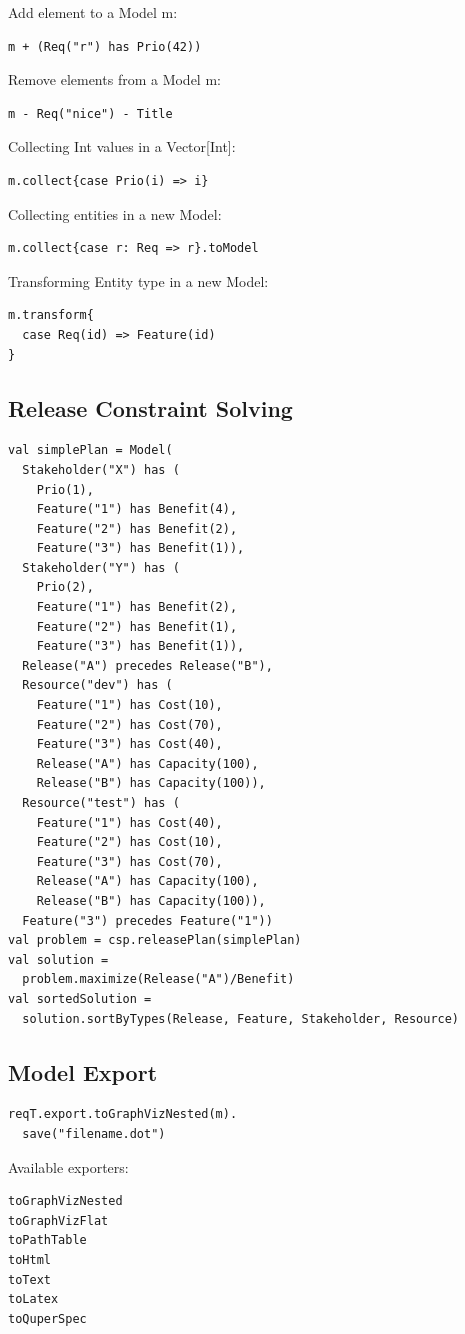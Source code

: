 \documentclass[9pt,a4paper,oneside]{report}
\begin{document}
\begin{multicols*}{4}
Add element to a Model m: 
\begin{lstlisting}
m + (Req("r") has Prio(42))
\end{lstlisting}

Remove elements from a Model m:
\begin{lstlisting}
m - Req("nice") - Title
\end{lstlisting}

Collecting Int values in a Vector[Int]:
\begin{lstlisting}
m.collect{case Prio(i) => i}
\end{lstlisting}

Collecting entities in a new Model:
\begin{lstlisting}
m.collect{case r: Req => r}.toModel
\end{lstlisting}

Transforming Entity type in a new Model:
\begin{lstlisting}
m.transform{
  case Req(id) => Feature(id)
}
\end{lstlisting}

\subsection*{Release Constraint Solving}
\begin{lstlisting}[basicstyle=\ttfamily\scriptsize]
val simplePlan = Model(
  Stakeholder("X") has (
    Prio(1),
    Feature("1") has Benefit(4),
    Feature("2") has Benefit(2),
    Feature("3") has Benefit(1)),
  Stakeholder("Y") has (
    Prio(2),
    Feature("1") has Benefit(2),
    Feature("2") has Benefit(1),
    Feature("3") has Benefit(1)),
  Release("A") precedes Release("B"),  
  Resource("dev") has (
    Feature("1") has Cost(10),
    Feature("2") has Cost(70),
    Feature("3") has Cost(40),
    Release("A") has Capacity(100),
    Release("B") has Capacity(100)),
  Resource("test") has (
    Feature("1") has Cost(40),
    Feature("2") has Cost(10),
    Feature("3") has Cost(70),
    Release("A") has Capacity(100),
    Release("B") has Capacity(100)),
  Feature("3") precedes Feature("1"))
val problem = csp.releasePlan(simplePlan)
val solution = 
  problem.maximize(Release("A")/Benefit)
val sortedSolution = 
  solution.sortByTypes(Release, Feature, Stakeholder, Resource)
\end{lstlisting}

\subsection*{Model Export}
\begin{lstlisting}
reqT.export.toGraphVizNested(m).
  save("filename.dot")
\end{lstlisting}
Available exporters:
\begin{lstlisting}
toGraphVizNested  
toGraphVizFlat  
toPathTable
toHtml
toText
toLatex
toQuperSpec
\end{lstlisting}
\end{multicols*}
\end{document}
